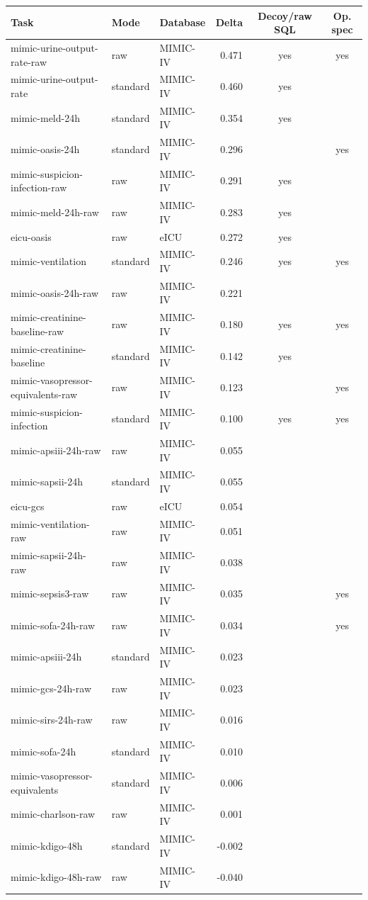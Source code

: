 \begin{tabular}{lllrcc}
\toprule
Task & Mode & Database & Delta & Decoy/raw SQL & Op. spec \\
\midrule
mimic-urine-output-rate-raw & raw & MIMIC-IV & 0.471 & yes & yes \\
mimic-urine-output-rate & standard & MIMIC-IV & 0.460 & yes &  \\
mimic-meld-24h & standard & MIMIC-IV & 0.354 & yes &  \\
mimic-oasis-24h & standard & MIMIC-IV & 0.296 &  & yes \\
mimic-suspicion-infection-raw & raw & MIMIC-IV & 0.291 & yes &  \\
mimic-meld-24h-raw & raw & MIMIC-IV & 0.283 & yes &  \\
eicu-oasis & raw & eICU & 0.272 & yes &  \\
mimic-ventilation & standard & MIMIC-IV & 0.246 & yes & yes \\
mimic-oasis-24h-raw & raw & MIMIC-IV & 0.221 &  &  \\
mimic-creatinine-baseline-raw & raw & MIMIC-IV & 0.180 & yes & yes \\
mimic-creatinine-baseline & standard & MIMIC-IV & 0.142 & yes &  \\
mimic-vasopressor-equivalents-raw & raw & MIMIC-IV & 0.123 &  & yes \\
mimic-suspicion-infection & standard & MIMIC-IV & 0.100 & yes & yes \\
mimic-apsiii-24h-raw & raw & MIMIC-IV & 0.055 &  &  \\
mimic-sapsii-24h & standard & MIMIC-IV & 0.055 &  &  \\
eicu-gcs & raw & eICU & 0.054 &  &  \\
mimic-ventilation-raw & raw & MIMIC-IV & 0.051 &  &  \\
mimic-sapsii-24h-raw & raw & MIMIC-IV & 0.038 &  &  \\
mimic-sepsis3-raw & raw & MIMIC-IV & 0.035 &  & yes \\
mimic-sofa-24h-raw & raw & MIMIC-IV & 0.034 &  & yes \\
mimic-apsiii-24h & standard & MIMIC-IV & 0.023 &  &  \\
mimic-gcs-24h-raw & raw & MIMIC-IV & 0.023 &  &  \\
mimic-sirs-24h-raw & raw & MIMIC-IV & 0.016 &  &  \\
mimic-sofa-24h & standard & MIMIC-IV & 0.010 &  &  \\
mimic-vasopressor-equivalents & standard & MIMIC-IV & 0.006 &  &  \\
mimic-charlson-raw & raw & MIMIC-IV & 0.001 &  &  \\
mimic-kdigo-48h & standard & MIMIC-IV & -0.002 &  &  \\
mimic-kdigo-48h-raw & raw & MIMIC-IV & -0.040 &  &  \\
\bottomrule
\end{tabular}
